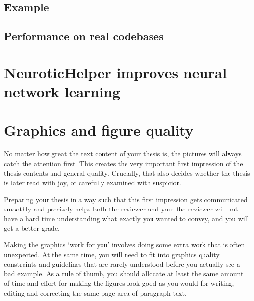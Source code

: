 \subsection{Example}
\subsection{Performance on real codebases}
\section{\sloppy NeuroticHelper improves neural network learning}

\section{Graphics and figure quality}

No matter how great the text content of your thesis is, the pictures will always catch the attention first. This creates the very important first impression of the thesis contents and general quality. Crucially, that also decides whether the thesis is later read with joy, or carefully examined with suspicion.

Preparing your thesis in a way such that this first impression gets communicated smoothly and precisely helps both the reviewer and you: the reviewer will not have a hard time understanding what exactly you wanted to convey, and you will get a better grade.

Making the graphics `work for you' involves doing some extra work that is often unexpected. At the same time, you will need to fit into graphics quality constraints and guidelines that are rarely understood before you actually see a bad example. As a rule of thumb, you should allocate at least the same amount of time and effort for making the figures look good as you would for writing, editing and correcting the same page area of paragraph text.

